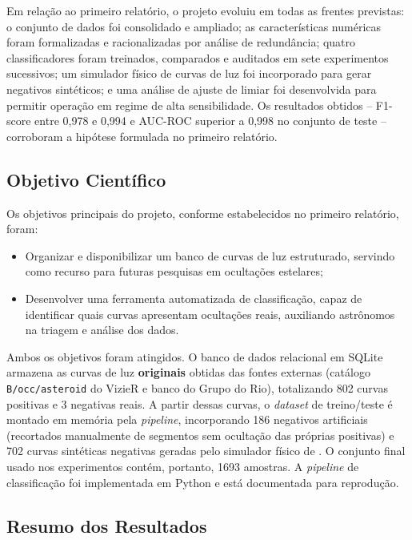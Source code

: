 \documentclass[12pt]{article}
\numberwithin{equation}{section}
\begin{document}
Em relação ao primeiro relatório, o projeto evoluiu em todas as frentes previstas: o conjunto de dados foi consolidado e ampliado; as características numéricas foram formalizadas e racionalizadas por análise de redundância; quatro classificadores foram treinados, comparados e auditados em sete experimentos sucessivos; um simulador físico de curvas de luz foi incorporado para gerar negativos sintéticos; e uma análise de ajuste de limiar foi desenvolvida para permitir operação em regime de alta sensibilidade. Os resultados obtidos -- F1-score entre 0,978 e 0,994 e AUC-ROC superior a 0,998 no conjunto de teste -- corroboram a hipótese formulada no primeiro relatório.

\subsection{Objetivo Científico}

Os objetivos principais do projeto, conforme estabelecidos no primeiro relatório, foram:

\begin{itemize}
    \item Organizar e disponibilizar um banco de curvas de luz estruturado, servindo como recurso para futuras pesquisas em ocultações estelares;
    \item Desenvolver uma ferramenta automatizada de classificação, capaz de identificar quais curvas apresentam ocultações reais, auxiliando astrônomos na triagem e análise dos dados.
\end{itemize}

Ambos os objetivos foram atingidos. O banco de dados relacional em SQLite armazena as curvas de luz \textbf{originais} obtidas das fontes externas (catálogo \texttt{B/occ/asteroid} do VizieR e banco do Grupo do Rio), totalizando 802 curvas positivas e 3 negativas reais. A partir dessas curvas, o \textit{dataset} de treino/teste é montado em memória pela \textit{pipeline}, incorporando 186 negativos artificiais (recortados manualmente de segmentos sem ocultação das próprias positivas) e 702 curvas sintéticas negativas geradas pelo simulador físico de \cite{Simulator}. O conjunto final usado nos experimentos contém, portanto, 1693 amostras. A \textit{pipeline} de classificação foi implementada em Python e está documentada para reprodução.

\subsection{Resumo dos Resultados}
\end{document}
